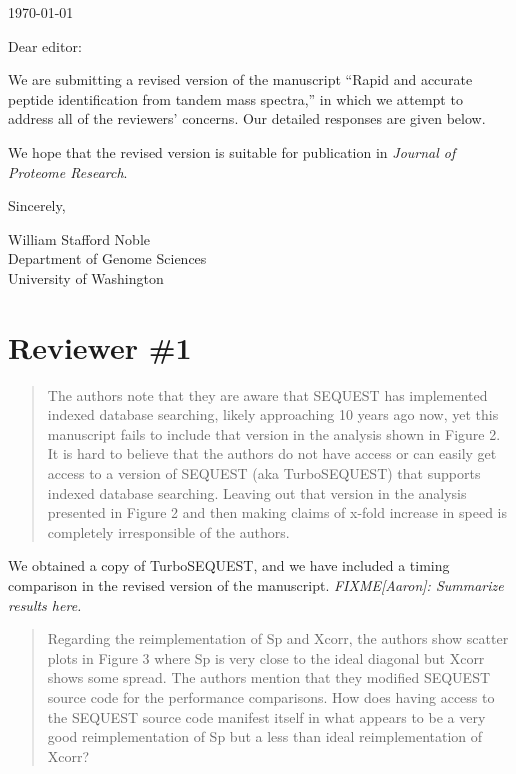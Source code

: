 \documentclass{article}
\newcommand{\breview}{\begin{quotation}\begin{em}\noindent}
\newcommand{\ereview}{\end{em}\end{quotation}}
\begin{document}
\hspace*{3.0in}\today

\vspace*{3ex}

\noindent
Dear editor:

\vspace*{1ex}

We are submitting a revised version of the manuscript ``Rapid and
accurate peptide identification from tandem mass spectra,'' in which
we attempt to address all of the reviewers' concerns.  Our detailed
responses are given below.

We hope that the revised version is suitable for publication in {\em
Journal of Proteome Research}.

\vspace*{1ex}

\noindent
Sincerely,

\hspace*{1ex}

\noindent
William Stafford Noble\\
Department of Genome Sciences\\
University of Washington


\section*{Reviewer \#1}

\breview The authors note that they are aware that SEQUEST has
implemented indexed database searching, likely approaching 10 years
ago now, yet this manuscript fails to include that version in the
analysis shown in Figure 2.  It is hard to believe that the authors do
not have access or can easily get access to a version of SEQUEST (aka
TurboSEQUEST) that supports indexed database searching.  Leaving out
that version in the analysis presented in Figure 2 and then making
claims of x-fold increase in speed is completely irresponsible of the
authors. \ereview

We obtained a copy of TurboSEQUEST, and we have included a timing
comparison in the revised version of the manuscript. {\em
FIXME[Aaron]: Summarize results here.}

\breview Regarding the reimplementation of Sp and Xcorr, the authors
show scatter plots in Figure 3 where Sp is very close to the ideal
diagonal but Xcorr shows some spread.  The authors mention that they
modified SEQUEST source code for the performance comparisons.  How
does having access to the SEQUEST source code manifest itself in what
appears to be a very good reimplementation of Sp but a less than ideal
reimplementation of Xcorr? \ereview
\end{document}
